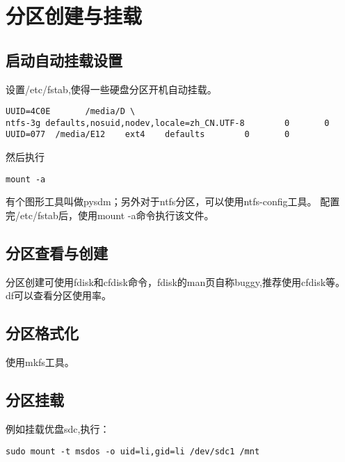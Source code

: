 \section{分区创建与挂载}

\label{diskpartition}
\subsection{启动自动挂载设置} 
设置/etc/fstab,使得一些硬盘分区开机自动挂载。
\begin{lstlisting}
UUID=4C0E       /media/D \          
ntfs-3g defaults,nosuid,nodev,locale=zh_CN.UTF-8        0       0   
UUID=077  /media/E12    ext4    defaults        0       0   
\end{lstlisting}

然后执行

\begin{lstlisting}
mount -a
\end{lstlisting}

有个图形工具叫做pysdm；另外对于ntfs分区，可以使用ntfs-config工具。
配置完/etc/fstab后，使用mount -a命令执行该文件。


\subsection{分区查看与创建}
分区创建可使用fdisk和cfdisk命令，fdisk的man页自称buggy,推荐使用cfdisk等。
df可以查看分区使用率。

\subsection{分区格式化}
使用mkfs工具。

\subsection{分区挂载}
例如挂载优盘sdc,执行：
\begin{verbatim}
sudo mount -t msdos -o uid=li,gid=li /dev/sdc1 /mnt
\end{verbatim}


